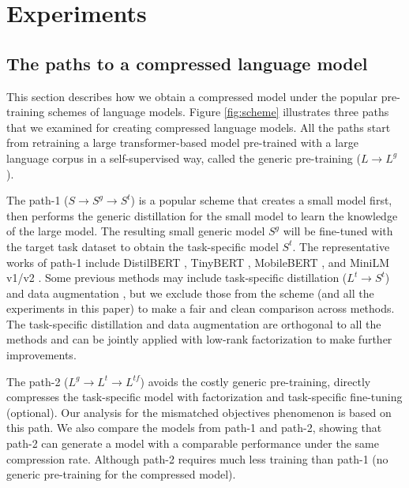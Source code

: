 \section{Experiments}



\subsection{The paths to a compressed language model}\label{sec:3path}


This section describes how we obtain a compressed model under the popular pre-training schemes of language models. Figure \ref{fig:scheme} illustrates three paths that we examined for creating compressed language models. All the paths start from retraining a large transformer-based model pre-trained with a large language corpus in a self-supervised way, called the generic pre-training ($L \rightarrow L^g$). 

The path-1 ($S \rightarrow S^g \rightarrow S^t$) is a popular scheme that creates a small model first, then performs the generic distillation for the small model to learn the knowledge of the large model. The resulting small generic model $S^g$ will be fine-tuned with the target task dataset to obtain the task-specific model $S^t$. The representative works of path-1 include DistilBERT \citep{sanh2019distilbert}, TinyBERT \citep{jiao2019tinybert}, MobileBERT \citep{sun2020mobilebert}, and MiniLM v1/v2 \citep{wang2020minilm,wang2020minilmv2}. Some previous methods may include task-specific distillation ($L^t \rightarrow S^t$) and data augmentation \citep{jiao2019tinybert}, but we exclude those from the scheme (and all the experiments in this paper) to make a fair and clean comparison across methods. The task-specific distillation and data augmentation are orthogonal to all the methods and can be jointly applied with low-rank factorization to make further improvements.

The path-2 ($L^g \rightarrow L^t \rightarrow L^{tf}$) avoids the costly generic pre-training, directly compresses the task-specific model with factorization and task-specific fine-tuning (optional). Our analysis for the mismatched objectives phenomenon is based on this path. We also compare the models from path-1 and path-2, showing that path-2 can generate a model with a comparable performance under the same compression rate. Although path-2 requires much less training than path-1 (no generic pre-training for the compressed model).

